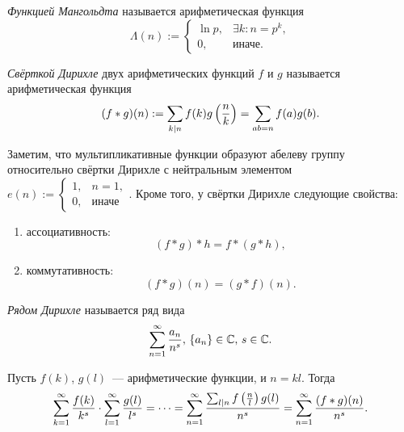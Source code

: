 \begin{ndefinition}
\label{def:I_Mangoldt-function}
	\emph{Функцией Мангольдта} называется арифметическая функция
	\[
	    \Lambda(n) := 
	    \begin{cases}
	    	\ln{p}, & \exists k\colon n = p^k, \\
	    	0, & \text{иначе}.
	    \end{cases}
	\]
\end{ndefinition}

\begin{ndefinition}
\label{def:I_Dirichlet-convolution}
	\emph{Свёрткой Дирихле} двух арифметических функций $f$ и $g$ называется арифметическая функция
	\[
		(f \ast g)(n) 
		:= \sum_{k \mid n} f(k)g\left( \frac{n}{k} \right) 
		= \sum_{ab = n} f(a)g(b).
	\]
\end{ndefinition}

\begin{remark}
\label{rmk:I-Dirichlet-convolution-properties}
	Заметим, что мультипликативные функции образуют абелеву группу относительно свёртки Дирихле с нейтральным элементом 
	$e(n) := 
	\begin{cases}
		1, & n = 1, \\
		0, & \text{иначе}
	\end{cases}$. 
	Кроме того, у свёртки Дирихле следующие свойства:
	\begin{enumerate}
		\item
		    ассоциативность:
		    \[
		        (f \ast g) \ast h = f \ast (g \ast h),
		    \]
		\item
		    коммутативность:
		    \[
		        (f \ast g)(n) = (g \ast f)(n).
		    \]
	\end{enumerate}
\end{remark}

\begin{ndefinition}
\label{def:I_Dirichlet-series}
	\emph{Рядом Дирихле} называется ряд вида
	\[
		\sum_{n=1}^{\infty} \frac{a_n}{n^s},\, \{a_n\} \in \mathbb{C},\, s \in \mathbb{C}.
	\]
\end{ndefinition}

\begin{remark}
	Пусть $f(k)$, $g(l)$ --- арифметические функции, и $n = kl$. Тогда
	\[
	    \sum_{k=1}^\infty \frac{f(k)}{k^s} \cdot \sum_{l=1}^\infty \frac{g(l)}{l^s} 
	    = \dots 
	    = \sum_{n=1}^\infty \frac{\sum_{l \mid n} f\left(\frac{n}{l}\right)g(l)}{n^s} 
	    = \sum_{n=1}^\infty \frac{(f \ast g)(n)}{n^s}.
	\]
\end{remark}

